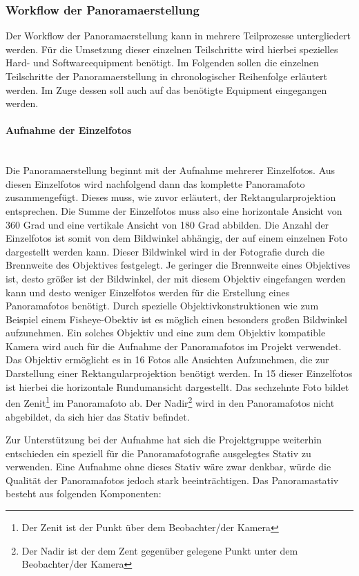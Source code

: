 \subsubsection{Workflow der Panoramaerstellung}
\label{sec:Workflow}

Der Workflow der Panoramaerstellung kann in mehrere Teilprozesse untergliedert
werden. Für die Umsetzung dieser einzelnen Teilschritte wird hierbei spezielles
Hard- und Softwareequipment benötigt. Im Folgenden sollen die einzelnen
Teilschritte der Panoramaerstellung in chronologischer Reihenfolge erläutert
werden. Im Zuge dessen soll auch auf das benötigte Equipment eingegangen
werden.

\paragraph{Aufnahme der Einzelfotos} \hfill \\

Die Panoramaerstellung beginnt mit der Aufnahme mehrerer Einzelfotos. Aus diesen
Einzelfotos wird nachfolgend dann das komplette Panoramafoto zusammengefügt.
Dieses muss, wie zuvor erläutert, der Rektangularprojektion entsprechen. Die
Summe der Einzelfotos muss also eine horizontale Ansicht von 360 Grad und eine
vertikale Ansicht von 180 Grad abbilden. Die Anzahl der Einzelfotos ist somit
von dem Bildwinkel abhängig, der auf einem einzelnen Foto dargestellt werden
kann. Dieser Bildwinkel wird in der Fotografie durch die Brennweite des
Objektives festgelegt. Je geringer die Brennweite eines Objektives ist, desto
größer ist der Bildwinkel, der mit diesem Objektiv eingefangen werden kann und
desto weniger Einzelfotos werden für die Erstellung eines Panoramafotos
benötigt. Durch spezielle Objektivkonstruktionen wie zum Beispiel einem
Fisheye-Obektiv ist es möglich einen besonders großen Bildwinkel aufzunehmen.
Ein solches Objektiv und eine zum dem Objektiv kompatible Kamera wird auch für die Aufnahme der
Panoramafotos im Projekt verwendet. Das Objektiv ermöglicht es in 16 Fotos alle
Ansichten Aufzunehmen, die zur Darstellung einer Rektangularprojektion benötigt
werden. In 15 dieser Einzelfotos ist hierbei die horizontale Rundumansicht
dargestellt. Das sechzehnte Foto bildet den Zenit\footnote{Der Zenit ist der
Punkt über dem Beobachter/der Kamera} im Panoramafoto ab. Der
Nadir\footnote{Der Nadir ist der dem Zent gegenüber gelegene Punkt unter dem
Beobachter/der Kamera} wird in den Panoramafotos nicht abgebildet, da sich hier
das Stativ befindet.

Zur Unterstützung bei der Aufnahme hat sich die Projektgruppe weiterhin
entschieden ein speziell für die Panoramafotografie ausgelegtes Stativ zu
verwenden. Eine Aufnahme ohne dieses Stativ wäre zwar denkbar, würde die
Qualität der Panoramafotos jedoch stark beeinträchtigen. Das Panoramastativ
besteht aus folgenden Komponenten:

